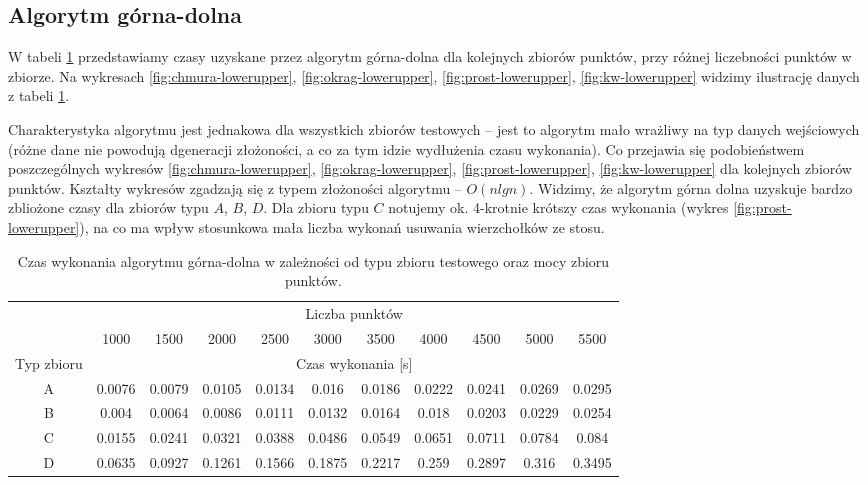 \documentclass[11pt]{article}
\theoremstyle{remark} \newtheorem{definition}{def.}
\theoremstyle{definition} \newtheorem{twierdzenie}{tw.}
\begin{document}
\subsection{Algorytm górna-dolna}

W tabeli \ref{tab:lowerupper} przedstawiamy czasy uzyskane przez algorytm górna-dolna dla kolejnych zbiorów punktów, przy różnej liczebności punktów w zbiorze. Na wykresach \ref{fig:chmura-lowerupper}, 
\ref{fig:okrag-lowerupper}, \ref{fig:prost-lowerupper}, \ref{fig:kw-lowerupper} widzimy ilustrację danych z tabeli \ref{tab:lowerupper}.


Charakterystyka algorytmu jest jednakowa dla wszystkich zbiorów testowych -- jest to algorytm mało wrażliwy na typ danych wejściowych (różne dane nie powodują dgeneracji złożoności, a co za tym idzie
wydłużenia czasu wykonania). Co przejawia się podobieństwem poszczególnych wykresów \ref{fig:chmura-lowerupper}, \ref{fig:okrag-lowerupper},
\ref{fig:prost-lowerupper}, \ref{fig:kw-lowerupper} dla kolejnych zbiorów punktów. Kształty wykresów zgadzają się z typem złożoności algorytmu -- $O(nlgn)$. Widzimy, że algorytm górna dolna uzyskuje bardzo 
zbliożone czasy dla zbiorów typu $A$, $B$, $D$. Dla zbioru typu $C$ notujemy ok. 4-krotnie krótszy czas wykonania (wykres \ref{fig:prost-lowerupper}), na co ma wpływ stosunkowa mała liczba wykonań usuwania wierzchołków ze stosu. 



\begin{table}[]
\centering
\caption{Czas wykonania algorytmu górna-dolna w zależności od typu zbioru testowego oraz mocy zbioru punktów.}
\label{tab:lowerupper}
\begin{tabular}{c|c|c|c|c|c|c|c|c|c|c|}
\cline{2-11}
\multicolumn{1}{l|}{} & \multicolumn{10}{c|}{Liczba punktów} \\ \cline{2-11} 
\multicolumn{1}{l|}{} & 1000 & 1500 & 2000 & 2500 & 3000 & 3500 & 4000 & 4500 & 5000 & 5500 \\ \hline
\multicolumn{1}{|c|}{Typ zbioru} & \multicolumn{10}{c|}{Czas wykonania [s]} \\ \hline
\multicolumn{1}{|c|}{A} & 0.0076 & 0.0079 & 0.0105 & 0.0134 & 0.016 & 0.0186 & 0.0222 & 0.0241 & 0.0269 & 0.0295 \\ \hline
\multicolumn{1}{|c|}{B} & 0.004 & 0.0064 & 0.0086 & 0.0111 & 0.0132 & 0.0164 & 0.018 & 0.0203 & 0.0229 & 0.0254 \\ \hline
\multicolumn{1}{|c|}{C} & 0.0155 & 0.0241 & 0.0321 & 0.0388 & 0.0486 & 0.0549 & 0.0651 & 0.0711 & 0.0784 & 0.084 \\ \hline
\multicolumn{1}{|c|}{D} & 0.0635 & 0.0927 & 0.1261 & 0.1566 & 0.1875 & 0.2217 & 0.259 & 0.2897 & 0.316 & 0.3495 \\ \hline
\end{tabular}
\end{table}
\end{document}
